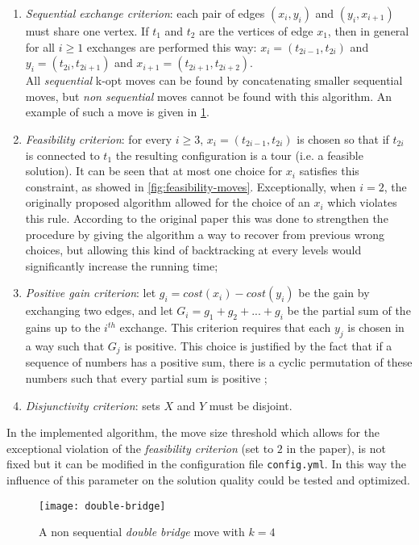 \begin{enumerate}
	\item \emph{Sequential exchange criterion}: each pair of edges $(x_i, y_i)$ and $(y_i, x_{i+1})$ must share one vertex. If $t_1$ and $t_2$ are the vertices of edge $x_1$, then in general for all $i \ge 1$ exchanges are performed this way: $x_i=(t_{2i-1}, t_{2i})$ and $y_i=(t_{2i}, t_{2i+1})$ and $x_{i+1}=(t_{2i+1}, t_{2i+2})$.\\ All \emph{sequential} k-opt moves can be found by concatenating smaller sequential moves, but \emph{non sequential} moves cannot be found with this algorithm. An example of such a move is given in \cref{fig:doublebridge}.
	\item \emph{Feasibility criterion}: for every $i \ge 3$, $x_i=(t_{2i-1}, t_{2i})$ is chosen so that if $t_{2i}$ is connected to $t_1$ the resulting configuration is a tour (i.e. a feasible solution). It can be seen that at most one choice for $x_i$ satisfies this constraint, as showed in \cref{fig:feasibility-moves}. Exceptionally, when $i=2$, the originally proposed algorithm allowed for the choice of an $x_i$ which violates this rule. According to the original paper this was done to strengthen the procedure by giving the algorithm a way to recover from previous wrong choices, but allowing this kind of backtracking at every levels would significantly increase the running time;
	\item \emph{Positive gain criterion}: let $g_i=cost(x_i) - cost(y_i)$ be the gain by exchanging two edges, and let $G_i=g_1+g_2+...+g_i$ be the partial sum of the gains up to the $i^{th}$ exchange. This criterion requires that each $y_j$ is chosen in a way such that $G_j$ is positive. This choice is justified by the fact that if a sequence of numbers has a positive sum, there is a cyclic permutation of these numbers such
	that every partial sum is positive \cite{Helsgaun2000};
	\item \emph{Disjunctivity criterion}: sets $X$ and $Y$ must be disjoint. 
\end{enumerate}
In the implemented algorithm, the move size threshold which allows for the exceptional violation of the \emph{feasibility criterion} (set to $2$ in the paper), is not fixed but it can be modified in the configuration file \texttt{config.yml}. In this way the influence of this parameter on the solution quality could be tested and optimized.

\begin{figure}[h]
	\centering
	\texttt{[image: double-bridge]}
	\caption{A non sequential \emph{double bridge} move with $k=4$}
	\label{fig:doublebridge}
\end{figure}

